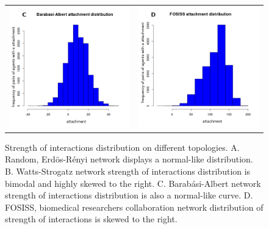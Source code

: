 \documentclass[11pt]{article}
\begin{document}
\begin{figure} [h!]
\begin{tabular}{cc}
\includegraphics[scale=0.28]{images/barabasi_trust.png} & 
\includegraphics[scale=0.28]{images/fosiss_trust.png}
\end{tabular}
\caption{Strength of interactions distribution on different topologies. A. Random, Erd\"{o}s-R\'enyi network displays a normal-like
  distribution. B. Watts-Strogatz network strength of interactions distribution is bimodal and highly skewed to the right. C.
  Barab\'asi-Albert network strength of interactions distribution is also a normal-like curve. D. FOSISS, biomedical researchers
  collaboration network distribution of strength of interactions is skewed to
  the right.}\label{histo_trust}  
\end{figure}
\end{document}
